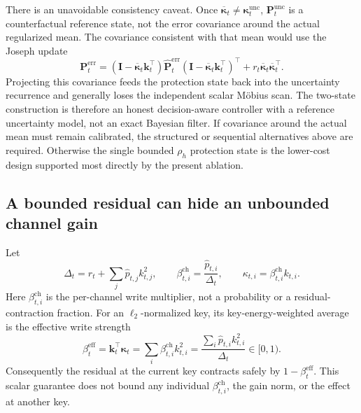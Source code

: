 \documentclass[11pt]{article}
\newcommand{\vct}[1]{\boldsymbol{#1}}
\begin{document}
There is an unavoidable consistency caveat. Once
$\overline{\vct{\kappa}}_t\ne\vct{\kappa}_t^{\mathrm{unc}}$,
$\vct{P}_t^{\mathrm{unc}}$ is a counterfactual reference state, not the error covariance around the
actual regularized mean. The covariance consistent with that mean would use the Joseph update
\begin{equation}
  \vct{P}_t^{\mathrm{err}}
  =(\vct{I}-\overline{\vct{\kappa}}_t\vct{k}_t^\top)
    \widehat{\vct{P}}_t^{\mathrm{err}}
    (\vct{I}-\overline{\vct{\kappa}}_t\vct{k}_t^\top)^\top
   +r_t\overline{\vct{\kappa}}_t\overline{\vct{\kappa}}_t^\top.
  \label{eq:discussion-protected-joseph-covariance}
\end{equation}
Projecting this covariance feeds the protection state back into the uncertainty recurrence and
generally loses the independent scalar M\"obius scan. The two-state construction is therefore an
honest decision-aware controller with a reference uncertainty model, not an exact Bayesian filter.
If covariance around the actual mean must remain calibrated, the structured or sequential
alternatives above are required. Otherwise the single bounded $\rho_h$ protection state is the
lower-cost design supported most directly by the present ablation.

\subsection{A bounded residual can hide an unbounded channel gain}

Let
\begin{equation}
  \Delta_t
  =r_t+\sum_j\widehat p_{t,j}k_{t,j}^2,
  \qquad
  \beta_{t,i}^{\mathrm{ch}}
  =\frac{\widehat p_{t,i}}{\Delta_t},
  \qquad
  \kappa_{t,i}=\beta_{t,i}^{\mathrm{ch}}k_{t,i}.
  \label{eq:discussion-channel-write-strength}
\end{equation}
Here $\beta_{t,i}^{\mathrm{ch}}$ is the per-channel write multiplier, not a probability or a
residual-contraction fraction. For an $\ell_2$-normalized key, its key-energy-weighted average is
the effective write strength
\begin{equation}
  \beta_t^{\mathrm{eff}}
  =\vct{k}_t^\top\vct{\kappa}_t
  =\sum_i\beta_{t,i}^{\mathrm{ch}}k_{t,i}^2
  =\frac{\sum_i\widehat p_{t,i}k_{t,i}^2}{\Delta_t}
  \in[0,1).
  \label{eq:discussion-channel-effective-write}
\end{equation}
Consequently the residual at the current key contracts safely by
$1-\beta_t^{\mathrm{eff}}$. This scalar guarantee does not bound any individual
$\beta_{t,i}^{\mathrm{ch}}$, the gain norm, or the effect at another key.
\end{document}
